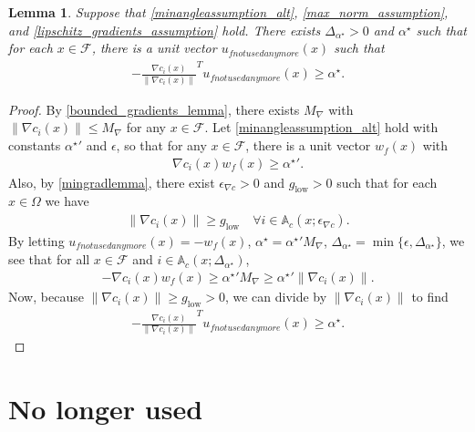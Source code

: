 \documentclass{article}
\newtheorem{lemma}[theorem]{Lemma}
\theoremstyle{case}
\numberwithin{theorem}{subsection}
\newcommand{\feasible}{{\mathcal F}}
\newcommand{\maxgrad}{{M_{\nabla}}}
\newcommand{\minanglealpha}{{ \alpha^{\star} }}
\newcommand{\minangledelta}{{\Delta_{\alpha^{\star}}}}
\newcommand{\mingradepsilon}{{\epsilon_{\nabla c}}}
\newcommand{\mingrad}{{ g_{\textrm{low}} }}
\newcommand{\minanglediralt}{{w_f}}
\newcommand{\minangledir}{{u_{f not used anymore}}}
\newcommand{\epsactive}{{\mathbb A_c}}
\begin{document}
\color{red}
\begin{lemma}
\label{minanglelemmap1}
Suppose that \cref{minangleassumption_alt}, \cref{max_norm_assumption}, and \cref{lipschitz_gradients_assumption} hold.
There exists $\minangledelta > 0$ and $\minanglealpha$ such that for each $x \in \feasible$, there is a unit vector $\minangledir(x)$ such that
\begin{align*}
-\frac {\nabla c_i(x)}{\|\nabla c_i(x)\|}^T \minangledir(x) \ge \minanglealpha.
\end{align*}
\end{lemma}
\begin{proof}
By \cref{bounded_gradients_lemma}, there exists $\maxgrad$ with $\|\nabla c_i(x) \| \le \maxgrad$ for any $x \in \feasible$.
Let \cref{minangleassumption_alt} hold with constants $\minanglealpha'$ and $\epsilon$, so that for any $x \in \feasible$, there is a unit vector $\minanglediralt(x)$ with
\begin{align*}
\nabla c_i(x)\minanglediralt(x) \ge \minanglealpha'.
\end{align*}
Also, by \cref{mingradlemma}, there exist $\mingradepsilon > 0$ and $\mingrad > 0$ such that for each $x \in \Omega$ we have
\begin{align*}
\| \nabla c_i(x) \| \ge \mingrad \quad \forall i \in \epsactive(x; \mingradepsilon).
\end{align*}
By letting $\minangledir(x) = -\minanglediralt(x)$, $\minanglealpha = \minanglealpha'\maxgrad$, $\minangledelta = \min\{\epsilon, \minangledelta\}$, 
we see that for all $x \in \feasible$ and $i \in \epsactive(x; \minangledelta)$,
\begin{align*}
-\nabla c_i(x) \minanglediralt(x) \ge \minanglealpha'\maxgrad \ge \minanglealpha'\|\nabla c_i(x)\|.
\end{align*}
Now, because $\| \nabla c_i(x) \| \ge \mingrad > 0$, we can divide by $\| \nabla c_i(x) \|$ to find
\begin{align*}
-\frac {\nabla c_i(x)}{\|\nabla c_i(x)\|}^T \minangledir(x) \ge \minanglealpha.
\end{align*}
\end{proof}
\color{black}



\section{No longer used}


\end{document}
